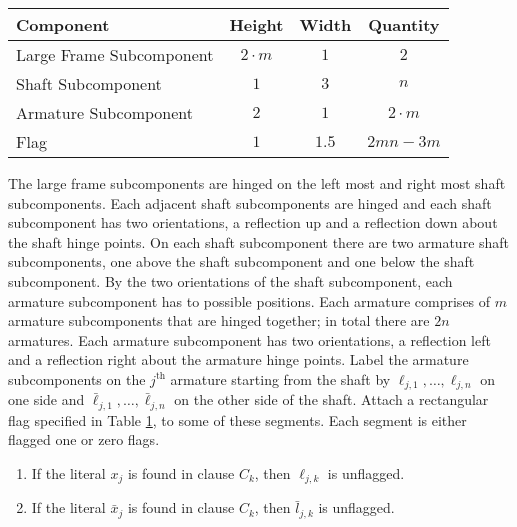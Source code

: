 \documentclass[10pt]{CSUNthesis}
\theoremstyle{plain}%
\theoremstyle{definition}
\theoremstyle{remark}
\begin{document}
\begin{table}
 	\begin{center}
		\begin{tabular}[c]{|l|c|c|c|}
		 \hline
		 Component & Height & Width & Quantity\\ \hline
		 Large Frame Subcomponent & $2\cdot m$ & $1$ & $2$\\ \hline
		 Shaft Subcomponent & $1$ & $3$ & $n$\\ \hline
		 Armature Subcomponent & $2$ & $1$ & $2\cdot m$\\ \hline
		 Flag & $1$ & $1.5$ & $2mn-3m$\\\hline
		\end{tabular}
		\label{tbl:hingedPolygonsv3-1a}
	\end{center}
\end{table}

The large frame subcomponents are hinged on the left most and right most shaft subcomponents. 
Each adjacent shaft subcomponents are hinged and each shaft subcomponent has two orientations, a reflection up and a reflection down about the shaft hinge points.  
On each shaft subcomponent there are two armature shaft subcomponents, one above the shaft subcomponent and one below the shaft subcomponent.  
By the two orientations of the shaft subcomponent, each armature subcomponent has to possible positions.  
Each armature comprises of $m$ armature subcomponents that are hinged together; in total there are $2n$ armatures.  
Each armature subcomponent has two orientations, a reflection left and a reflection right about the armature hinge points.  
Label the armature subcomponents on the $j^\text{th}$ armature starting from the shaft by $\ell_{j,1},\ldots,\ell_{j,n}$ on one side and  $\bar{\ell}_{j,1},\ldots,\bar{\ell}_{j,n}$ on the other side of the shaft.  
Attach a rectangular flag specified in Table \ref{tbl:hingedPolygonsv3-1a}, to some of these segments. 
Each segment is either flagged one or zero flags.
\begin{enumerate}
	 \item If the literal $x_j$ is found in clause $C_k$, then $\ell_{j,k}$ is unflagged.
	 \item If the literal $\bar{x}_j$ is found in clause $C_k$, then $\bar{l}_{j,k}$ is unflagged.
\end{enumerate}
\end{document}
